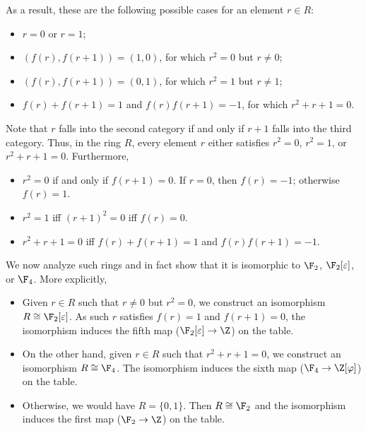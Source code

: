 As a result, these are the following possible cases for an element $r \in R$:
\begin{itemize}
    \item   $r = 0$ or $r = 1$;
    \item   $(f(r), f(r + 1)) = (1, 0)$, for which $r^2 = 0$ but $r \neq 0$;
    \item   $(f(r), f(r + 1)) = (0, 1)$, for which $r^2 = 1$ but $r \neq 1$;
    \item   $f(r) + f(r + 1) = 1$ and $f(r) f(r + 1) = -1$, for which $r^2 + r + 1 = 0$.
\end{itemize}

Note that $r$ falls into the second category if and only if $r + 1$ falls into the third category.
Thus, in the ring $R$, every element $r$ either satisfies $r^2 = 0$, $r^2 = 1$, or $r^2 + r + 1 = 0$.
Furthermore,

\begin{itemize}

    \item 
    $r^2 = 0$ if and only if $f(r + 1) = 0$.
    If $r = 0$, then $f(r) = -1$; otherwise $f(r) = 1$.

    \item
    $r^2 = 1$ iff $(r + 1)^2 = 0$ iff $f(r) = 0$.

    \item
    $r^2 + r + 1 = 0$ iff $f(r) + f(r + 1) = 1$ and $f(r) f(r + 1) = -1$.

\end{itemize}

We now analyze such rings and in fact show that it is isomorphic to $\F_2$, $\F_2[\varepsilon]$, or $\F_4$.
More explicitly,

\begin{itemize}
    \item   Given $r \in R$ such that $r \neq 0$ but $r^2 = 0$, we construct an isomorphism $R \cong \F_2[\varepsilon]$.
            As such $r$ satisfies $f(r) = 1$ and $f(r + 1) = 0$, the isomorphism induces the fifth map ($\F_2[\varepsilon] \to \Z$) on the table.
    \item   On the other hand, given $r \in R$ such that $r^2 + r + 1 = 0$, we construct an isomorphism $R \cong \F_4$.
            The isomorphism induces the sixth map ($\F_4 \to \Z[\varphi]$) on the table.
    \item   Otherwise, we would have $R = \{0, 1\}$.
            Then $R \cong \F_2$ and the isomorphism induces the first map ($\F_2 \to \Z$) on the table.
\end{itemize}

